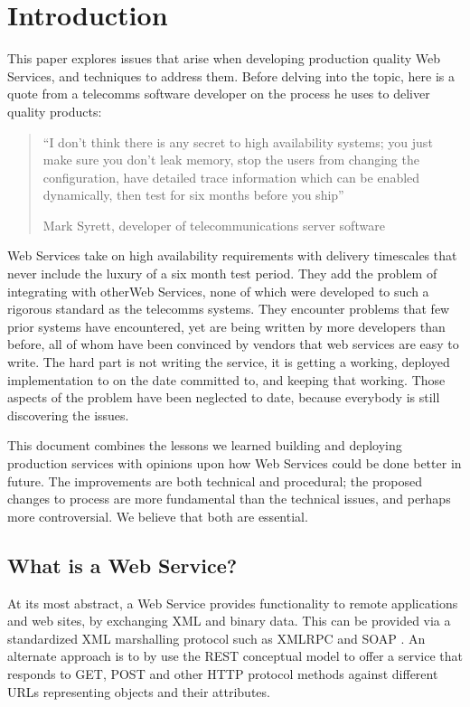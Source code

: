 \documentclass[draft]{report}
\begin{document}
\tableofcontents

\chapter{Introduction}

This paper explores issues that arise when developing production quality
Web Services, and techniques to address them. Before delving into the
topic, here is a quote from a telecomms software developer on the
process he uses to deliver quality products:

\begin{quote}

``I don't think there is any secret to high availability systems; you
just make sure you don't leak memory, stop the users from changing the
configuration, have detailed trace information which can be enabled
dynamically, then test for six months before you ship''

Mark Syrett, developer of telecommunications server software
\cite{mrs:email}

\end{quote}

Web Services take on high availability requirements with delivery
timescales that never include the luxury of a six month test period.
They add the problem of integrating with otherWeb Services, none of
which were developed to such a rigorous standard as the telecomms
systems. They encounter problems that few prior systems have
encountered, yet are being written by more developers than before, all
of whom have been convinced by vendors that web services are easy to
write. The hard part is not writing the service, it is getting a
working, deployed implementation to on the date committed to, and
keeping that working. Those aspects of the problem have been neglected
to date, because everybody is still discovering the issues.

This document combines the lessons we learned building and deploying
production services with opinions upon how Web Services could be done
better in future. The improvements are both technical and procedural;
the proposed changes to process are more fundamental than the technical
issues, and perhaps more controversial. We believe that both are
essential.

\section{What is a Web Service?}

At its most abstract, a Web Service provides functionality to remote
applications and web sites, by exchanging XML and binary data. This can
be provided via a standardized XML marshalling protocol such as XMLRPC
\cite{winer:xmlrpc} and SOAP \cite{spec:SOAP1.1,spec:SOAP1.2}. An
alternate approach is to by use the REST conceptual model
\cite{fielding:rest} to offer a service that responds to GET, POST and
other HTTP protocol methods against different URLs representing objects
and their attributes.
\end{document}
